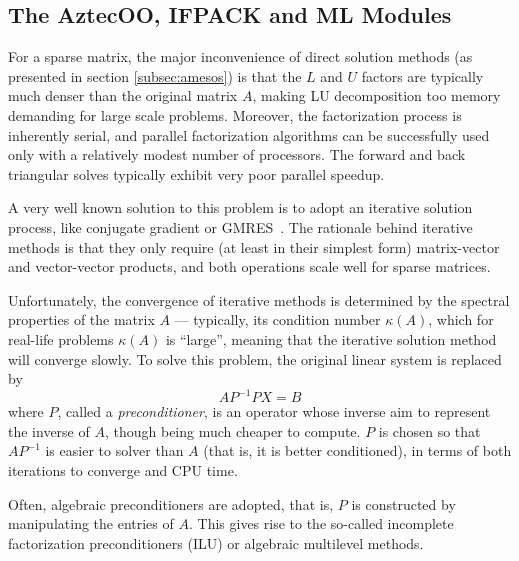 \documentclass[acmtocl]{acmtrans2m}
\begin{document}
\subsection{The AztecOO, IFPACK and ML Modules}
\label{subsec:aztecoo_ifpack}

For a sparse matrix, the major inconvenience of direct solution
methods (as presented in section \ref{subsec:amesos})
  is that the $L$ and $U$ factors are typically much denser than
the original matrix $A$, making LU decomposition too memory
demanding for large scale problems. Moreover, the factorization
process is inherently serial, and parallel factorization algorithms
can be successfully used only with a relatively modest number of
processors. The forward and back triangular solves typically exhibit
very poor parallel speedup.

A very well known solution to this problem is to adopt an iterative
solution process, like conjugate gradient or GMRES~\cite{golub96matrix}. The
rationale behind iterative methods is that they only require (at least
in their simplest form) matrix-vector and vector-vector products, and
both operations scale well for sparse matrices.

Unfortunately, the convergence of iterative methods is determined by
the spectral properties of the matrix $A$ --- typically, its condition
number $\kappa(A)$, which for real-life problems $\kappa(A)$ is
``large'', meaning that the iterative solution method will converge
slowly. To solve this problem, the original linear system is replaced
by
\[
A P^{-1} P X = B
\]
where $P$, called a {\sl preconditioner}, is an operator whose inverse
aim to represent the inverse of $A$, though being much cheaper to
compute.  $P$ is chosen so that $AP^{-1}$ is easier to solver than $A$
(that is, it is better conditioned), in terms of both iterations to converge
and CPU time.

\smallskip

Often, algebraic preconditioners are adopted, that is, $P$ is
constructed by manipulating the entries of $A$. This gives rise to the
so-called incomplete factorization preconditioners (ILU) or algebraic
multilevel methods.
\end{document}
